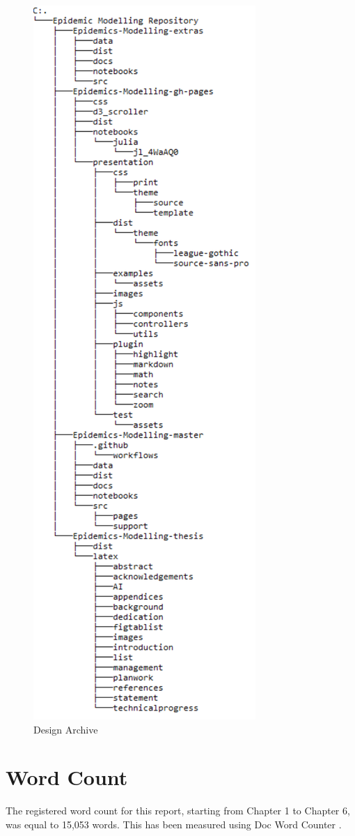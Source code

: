 \begin{appendices}
\begin{figure}[ht!]
    \includegraphics[page=1,scale=0.76]{latex/images/archive.pdf}
    \vspace*{-2mm}
    \caption{Design Archive}%
\end{figure}

\clearpage


\section{Word Count}
\label{count}

The registered word count for this report, starting from Chapter 1 to Chapter 6, was equal to 15,053 words.  This has been measured using Doc Word Counter \cite{count_w}.

\end{appendices}